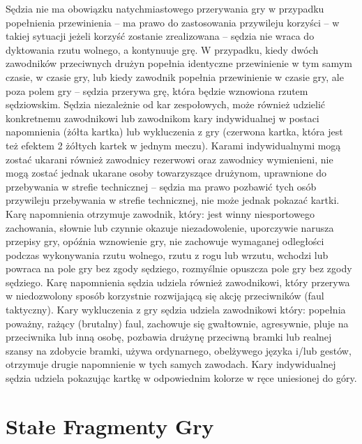 \documentclass[14pt,oneside,a4paper]{book}
\theoremstyle{break}
\begin{document}
Sędzia nie ma obowiązku natychmiastowego przerywania gry w przypadku popełnienia przewinienia – ma prawo do zastosowania przywileju korzyści – w takiej sytuacji jeżeli korzyść zostanie zrealizowana – sędzia nie wraca do dyktowania rzutu wolnego, a kontynuuje grę. W przypadku, kiedy dwóch zawodników przeciwnych drużyn popełnia identyczne przewinienie w tym samym czasie, w czasie gry, lub kiedy zawodnik popełnia przewinienie w czasie gry, ale poza polem gry – sędzia przerywa grę, która będzie wznowiona rzutem sędziowskim.
Sędzia niezależnie od kar zespołowych, może również udzielić konkretnemu zawodnikowi lub zawodnikom kary indywidualnej w postaci napomnienia (żółta kartka) lub wykluczenia z gry (czerwona kartka, która jest też efektem 2 żółtych kartek w jednym meczu). Karami indywidualnymi mogą zostać ukarani również zawodnicy rezerwowi oraz zawodnicy wymienieni, nie mogą zostać jednak ukarane osoby towarzyszące drużynom, uprawnione do przebywania w strefie technicznej – sędzia ma prawo pozbawić tych osób przywileju przebywania w strefie technicznej, nie może jednak pokazać kartki. Karę napomnienia otrzymuje zawodnik, który: jest winny niesportowego zachowania, słownie lub czynnie okazuje niezadowolenie, uporczywie narusza przepisy gry, opóźnia wznowienie gry, nie zachowuje wymaganej odległości podczas wykonywania rzutu wolnego, rzutu z rogu lub wrzutu, wchodzi lub powraca na pole gry bez zgody sędziego, rozmyślnie opuszcza pole gry bez zgody sędziego. Karę napomnienia sędzia udziela również zawodnikowi, który przerywa w niedozwolony sposób korzystnie rozwijającą się akcję przeciwników (faul taktyczny). Kary wykluczenia z gry sędzia udziela zawodnikowi który: popełnia poważny, rażący (brutalny) faul, zachowuje się gwałtownie, agresywnie, pluje na przeciwnika lub inną osobę, pozbawia drużynę przeciwną bramki lub realnej szansy na zdobycie bramki, używa ordynarnego, obelżywego języka i/lub gestów, otrzymuje drugie napomnienie w tych samych zawodach. Kary indywidualnej sędzia udziela pokazując kartkę w odpowiednim kolorze w ręce uniesionej do góry.

\section {Stałe Fragmenty Gry}
\end{document}
